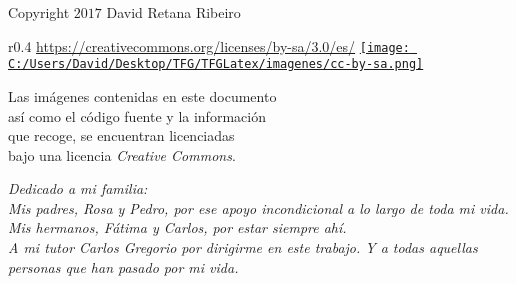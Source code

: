 \documentclass[10pt, a4paper, twoside]{report} %
\begin{document}





\newpage
\thispagestyle{empty} %
\null\vfill


\newpage
\thispagestyle{empty} %
\null\vfill


\textcopyright \hspace{0.3cm} Copyright $2017$ David Retana Ribeiro\\

\begin{wrapfigure}{r}{0.4\textwidth}
  \centering \url{https://creativecommons.org/licenses/by-sa/3.0/es/}
  \href{https://creativecommons.org/licenses/by-sa/3.0/es/}
       {\texttt{[image: C:/Users/David/Desktop/TFG/TFGLatex/imagenes/cc-by-sa.png]}}
\end{wrapfigure}
\noindent Las imágenes contenidas en este documento \\
así como el código fuente y la información \\
que recoge, se encuentran licenciadas \\
bajo una licencia \textit{Creative Commons}.

\clearpage

\thispagestyle{empty}
\begin{flushright}
  \textit{Dedicado a mi familia: \\
  Mis padres, Rosa y Pedro, por ese apoyo incondicional a lo largo de toda mi vida. \\
  Mis hermanos, Fátima y Carlos, por estar siempre ahí.\\
  A mi tutor Carlos Gregorio por dirigirme en este trabajo.
  Y a todas aquellas personas que han pasado por mi vida.}
\end{flushright}
\end{document}
